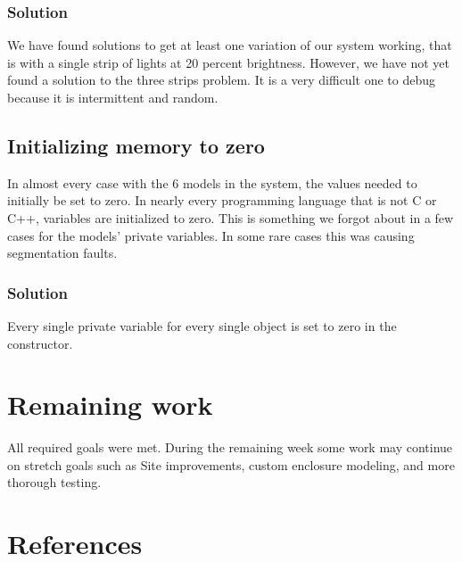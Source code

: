 \documentclass[onecolumn, draftclsnofoot,10pt, compsoc]{IEEEtran}
\begin{document}
			\subsubsection{Solution}
				We have found solutions to get at least one variation of our system working, that is with a single strip of lights at 20 percent brightness.
				However, we have not yet found a solution to the three strips problem. It is a very difficult one to debug because it is intermittent and random.
		
		\subsection{Initializing memory to zero}
			In almost every case with the 6 models in the system, the values needed to initially be set to zero.
			In nearly every programming language that is not C or C++, variables are initialized to zero.
			This is something we forgot about in a few cases for the models' private variables.
			In some rare cases this was causing segmentation faults.
			
			\subsubsection{Solution}
				Every single private variable for every single object is set to zero in the constructor.


	\section{Remaining work}
	All required goals were met.
	During the remaining week some work may continue on stretch goals such as Site improvements, custom enclosure modeling, and more thorough testing.


	\section{References}
			\begingroup
				\renewcommand{\addcontentsline}[3]{}%
				\renewcommand{\section}[2]{}%
				
				
			\endgroup
\end{document}
